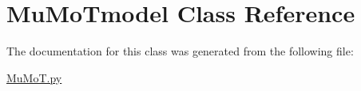 \hypertarget{class_mu_mo_t_1_1_mu_mo_tmodel}{}\section{Mu\+Mo\+Tmodel Class Reference}
\label{class_mu_mo_t_1_1_mu_mo_tmodel}


The documentation for this class was generated from the following file\+:\begin{DoxyCompactItemize}
\item 
\hyperlink{_mu_mo_t_8py}{Mu\+Mo\+T.\+py}\end{DoxyCompactItemize}
